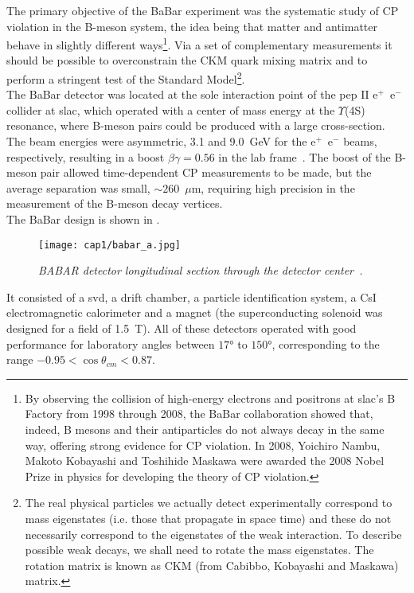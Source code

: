 \hskip 1cm The primary objective of the BaBar experiment was the systematic
study of CP violation in the B-meson system, the idea being that matter and
antimatter behave in slightly different ways\footnote{By observing the collision
  of high-energy electrons and positrons at \gls{slac}'s B Factory from 1998
  through 2008, the BaBar collaboration showed that, indeed, B mesons and their
  antiparticles do not always decay in the same way, offering strong evidence
  for CP violation. In 2008, Yoichiro Nambu, Makoto Kobayashi and Toshihide
  Maskawa were awarded the 2008 Nobel Prize in physics for developing the theory
  of CP violation.}. Via a set of complementary measurements it should be
possible to overconstrain the CKM quark mixing matrix and to perform a stringent
test of the Standard Model\footnote{The real physical particles we actually
  detect experimentally correspond to mass eigenstates (i.e. those that
  propagate in space time) and these do not necessarily correspond to the
  eigenstates of the weak interaction. To describe possible weak decays, we
  shall need to rotate the mass eigenstates. The rotation matrix is known as CKM
  (from Cabibbo, Kobayashi and Maskawa) matrix. }.\\
The BaBar detector was located at the sole interaction point of the \gls{pep} II
e$^+$~e$^-$ collider at \gls{slac}, which operated with a center of mass energy
at the $\Upsilon$(4S) resonance, where B-meson pairs could be produced with a
large cross-section. The beam energies were asymmetric, 3.1 and 9.0~GeV for the
e$^+$~e$^-$ beams, respectively, resulting in a boost $\beta \gamma = 0.56$ in
the lab frame~\cite{BaBar}. The boost of the B-meson pair allowed time-dependent
CP measurements to be made, but the average separation was small,
$\sim 260$~$\mu$m, requiring high
precision in the measurement of the B-meson decay vertices.\\
The BaBar design is shown in .
\begin{figure}[!htbp]
  \centering\texttt{[image: cap1/babar\_a.jpg]}
  \caption{\it BABAR detector longitudinal section through the detector
    center~\cite{babar_status_2001}.}\label{babar_a}
\end{figure}
It consisted of a \gls{svd}, a drift chamber, a particle identification system,
a CsI electromagnetic calorimeter and a magnet (the superconducting solenoid was
designed for a field of 1.5~T). All of these detectors operated with good
performance for laboratory angles between $\ang{17}$ to $\ang{150}$,
corresponding to the range $-0.95 < \cos \theta_{cm} < 0.87$.\\
